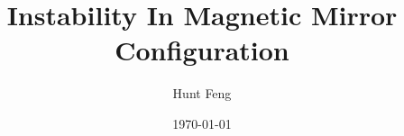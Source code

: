 \documentclass{beamer}
\title{Instability In Magnetic Mirror Configuration}
\author{Hunt Feng}
\institute{University of Saskatchewan}
\date{\today}
\begin{document}
	\frame{\titlepage}

	\begin{frame}
		\cite{aikawa_stability_1979}
	\end{frame}

	
	 
\end{document}
